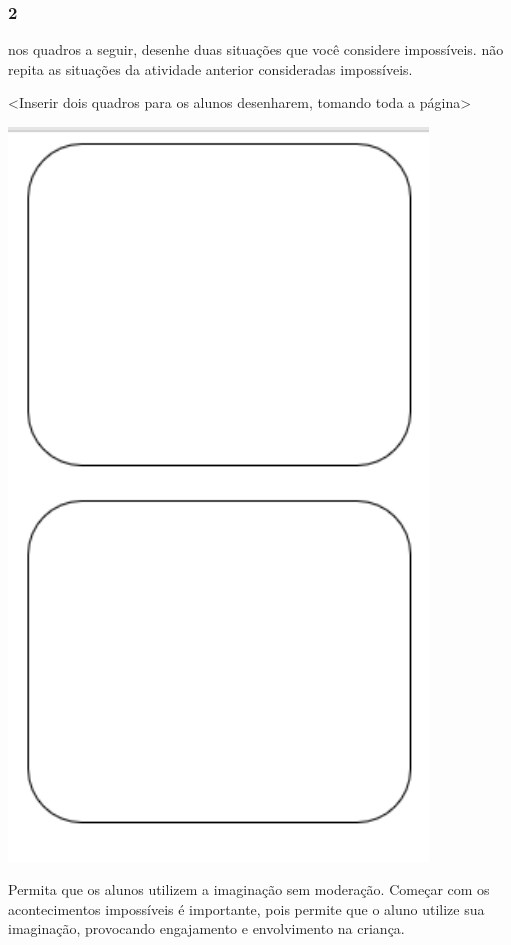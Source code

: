 \subsubsection{2}\label{section-64}

nos quadros a seguir, desenhe duas situações que você considere
impossíveis. não repita as situações da atividade anterior consideradas impossíveis.

\textless{}Inserir dois quadros para os alunos desenharem, tomando toda
a página\textgreater{}

\includegraphics[width=4.38938in,height=7.65199in]{media/image81.png}

Permita que os alunos utilizem a
imaginação sem moderação. Começar com os acontecimentos
impossíveis é importante, pois permite que o aluno utilize sua
imaginação, provocando engajamento e envolvimento na criança.

